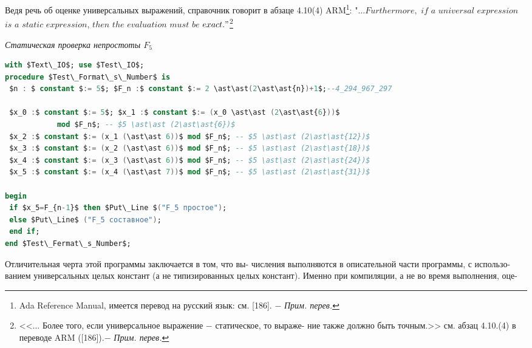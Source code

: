 \newpage
Ведя речь об оценке универсальных выражений, справочник говорит\linebreak
в абзаце 4.10(4) ARM\footnote{
Ada Reference Manual, имеется перевод на русский язык: см. [186]. $-$\linebreak
\textit{Прим. перев.}
}:\newline
\hspace*{25pt}"$...Furthermore,$ $if$ $a$ $universal$ $expression$ $is$ $a$ $static$ $expression$,\newline
\hspace*{15pt}$then$ $the$ $evaluation$ $must$ $be$ $exact."$\footnote{
<<... Более того, если универсальное выражение $-$ статическое, то выраже-\linebreak
ние также должно быть точным.>> см. абзац 4.10.(4) в переводе ARM ([186]).$-$\linebreak
\textit{Прим. перев.}
}
\begin{center}
\textit{Статическая проверка непростоты $F_5$}
\end{center}
\begin{lstlisting}[mathescape=true, language=Ada]
with $Text\_IO$; use $Test\_IO$;
procedure $Test\_Format\_s\_Number$ is
 $n : $ constant $:= 5$; $F_n :$ constant $:= 2 \ast\ast(2\ast\ast{n})+1$;--4_294_967_297
 
 $x_0 :$ constant $:= 5$; $x_1 :$ constant $:= (x_0 \ast\ast (2\ast\ast{6}))$
            mod $F_n$; -- $5 \ast\ast (2\ast\ast{6})$
 $x_2 :$ constant $:= (x_1 (\ast\ast 6))$ mod $F_n$; -- $5 \ast\ast (2\ast\ast{12})$
 $x_3 :$ constant $:= (x_2 (\ast\ast 6))$ mod $F_n$; -- $5 \ast\ast (2\ast\ast{18})$
 $x_4 :$ constant $:= (x_3 (\ast\ast 6))$ mod $F_n$; -- $5 \ast\ast (2\ast\ast{24})$
 $x_5 :$ constant $:= (x_4 (\ast\ast 7))$ mod $F_n$; -- $5 \ast\ast (2\ast\ast{31})$

begin
 if $x_5=F_{n-1}$ then $Put\_Line $("F_5 простое");
 else $Put\_Line$ ("F_5 составное");
 end if;
end $Test\_Fermat\_s_Number$;
\end{lstlisting}
\hspace*{15pt}Отличительная  черта  этой  программы  заключается  в  том,  что  вы-\linebreak
числения  выполняются  в  описательной  части  программы,  с  использо-\linebreak
ванием  универсальных  целых  констант  (а  не  типизированных  целых\linebreak
констант).  Именно  при  компиляции,  а  не  во  время  выполнения,  оце-\linebreak
